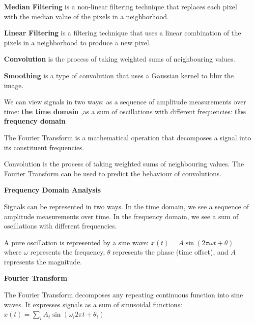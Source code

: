 \documentclass{article}
\begin{document}
\textbf{Median Filtering} is a non-linear filtering technique that replaces each pixel with the median value of the pixels in a neighborhood.

\textbf{Linear Filtering} is a filtering technique that uses a linear combination of the pixels in a neighborhood to produce a new pixel.


\textbf{Convolution} is the process of taking weighted sums of neighbouring values.


\textbf{Smoothing} is a type of convolution that uses a Gaussian kernel to blur the image.


We can view signals in two ways: as a sequence of amplitude measurements over time: \textbf{the time domain}
,as a sum of oscillations with different frequencies: \textbf{the frequency domain}


The Fourier Transform is a mathematical operation that decomposes a signal into its constituent frequencies.


Convolution is the process of taking weighted sums of neighbouring values.
The Fourier Transform can be used to predict the behaviour of convolutions.



\textbf{Frequency Domain Analysis}

Signals can be represented in two ways. In the time domain, we see a sequence of amplitude measurements over time. In the frequency domain, we see a sum of oscillations with different frequencies.

A pure oscillation is represented by a sine wave:
$x(t) = A\sin(2\pi\omega t + \theta)$
where $\omega$ represents the frequency, $\theta$ represents the phase (time offset), and $A$ represents the magnitude.

\textbf{Fourier Transform}

The Fourier Transform decomposes any repeating continuous function into sine waves. It expresses signals as a sum of sinusoidal functions:
$x(t) = \sum_i A_i\sin(\omega_i 2\pi t + \theta_i)$
\end{document}
